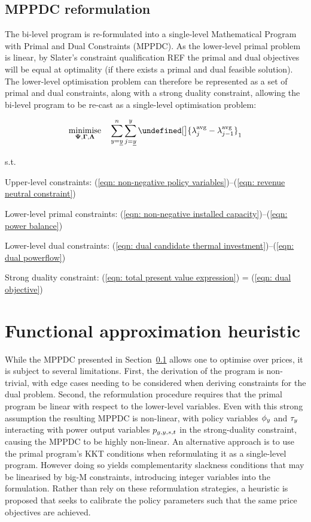 \documentclass{article}
\let\norm\undefined %
\DeclarePairedDelimiter\norm{\lVert}{\rVert}
\DeclareMathOperator*{\minimise}{minimise}
\begin{document}
 
\subsection{MPPDC reformulation}
\label{subsec: mppdc reformulation}
The bi-level program is re-formulated into a single-level Mathematical Program with Primal and Dual Constraints (MPPDC). As the lower-level primal problem is linear, by Slater's constraint qualification REF the primal and dual objectives will be equal at optimality (if there exists a primal and dual feasible solution). The lower-level optimisation problem can therefore be represented as a set of primal and dual constraints, along with a strong duality constraint, allowing the bi-level program to be re-cast as a single-level optimisation problem:

\begin{equation}
\minimise\limits_{\bm{\Psi}, \bm{\Gamma}, \bm{\Lambda}} \quad \sum\limits_{\iYear=\iYearStart}^{\iYearTransition} \sum\limits_{\iYearAlias=\iYearStart}^{\iYear} \norm[\big]{\dAveragePrice[\iYearAlias] - \dAveragePrice[\iYearAlias-1]}_{1} \nonumber
\end{equation}

s.t.

Upper-level constraints:
(\ref{eqn: non-negative policy variables})--(\ref{eqn: revenue neutral constraint})

Lower-level primal constraints:
(\ref{eqn: non-negative installed capacity})--(\ref{eqn: power balance})

Lower-level dual constraints:
(\ref{eqn: dual candidate thermal investment})--(\ref{eqn: dual powerflow})

Strong duality constraint:
(\ref{eqn: total present value expression}) = (\ref{eqn: dual objective})
 
\section{Functional approximation heuristic}
While the MPPDC presented in Section~\ref{subsec: mppdc reformulation} allows one to optimise over prices, it is subject to several limitations. First, the derivation of the program is non-trivial, with edge cases needing to be considered when deriving constraints for the dual problem. Second, the reformulation procedure requires that the primal program be linear with respect to the lower-level variables. Even with this strong assumption the resulting MPPDC is non-linear, with policy variables $\phi_{y}$ and $\tau_{y}$ interacting with power output variables $p_{g,y,s,t}$ in the strong-duality constraint, causing the MPPDC to be highly non-linear. An alternative approach is to use the primal program's KKT conditions when reformulating it as a single-level program. However doing so yields complementarity slackness conditions that may be linearised by big-M constraints, introducing integer variables into the formulation. Rather than rely on these reformulation strategies, a heuristic is proposed that seeks to calibrate the policy parameters such that the same price objectives are achieved.
\end{document}
